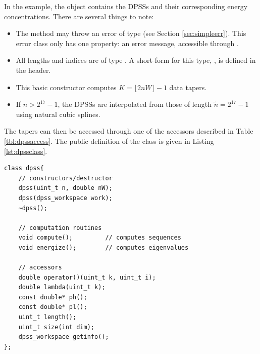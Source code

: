 \noindent In the example, the  object contains the DPSSs and their corresponding energy concentrations.  There are several things to note:
\begin{itemize}
    \item The  method may throw an error of type  (see Section \ref{sec:simpleerr}).  This error class only has one property: an error message, accessible through .
    \item All lengths and indices are of type .  A short-form for this type, , is defined in the  header.
    \item This basic constructor computes $K=\lfloor2nW\rfloor-1$ data tapers.
    \item If $n>2^{17}-1$, the DPSSs are interpolated from those of length $\tilde{n}=2^{17}-1$ using natural cubic splines.
\end{itemize}
The tapers can then be accessed through one of the accessors described in Table \ref{tbl:dpssaccess}.  The public definition of the  class is given in Listing \ref{lst:dpssclass}.

\begin{lstlisting}[label=lst:dpssclass,caption=The \texttt{dpss} class]
class dpss{
    // constructors/destructor
    dpss(uint_t n, double nW);
    dpss(dpss_workspace work);
    ~dpss();

    // computation routines
    void compute();         // computes sequences
    void energize();        // computes eigenvalues

    // accessors
    double operator()(uint_t k, uint_t i);
    double lambda(uint_t k);
    const double* ph();
    const double* pl();
    uint_t length();
    uint_t size(int dim);
    dpss_workspace getinfo();
};
\end{lstlisting}

